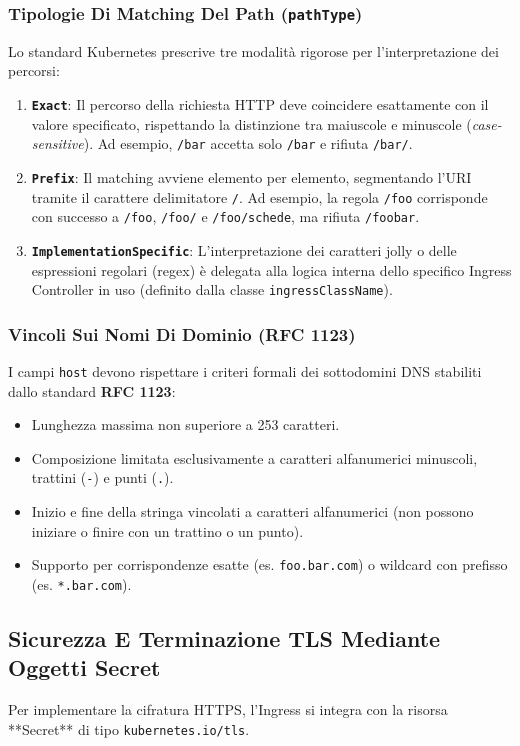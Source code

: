 \documentclass[11pt, a4paper]{article}
\begin{document}
\subsubsection{Tipologie Di Matching Del Path (\texttt{pathType})}
Lo standard Kubernetes prescrive tre modalità rigorose per l'interpretazione dei percorsi:
\begin{enumerate}[noitemsep]
    \item \textbf{\texttt{Exact}}: Il percorso della richiesta HTTP deve coincidere esattamente con il valore specificato, rispettando la distinzione tra maiuscole e minuscole (\emph{case-sensitive}). Ad esempio, \texttt{/bar} accetta solo \texttt{/bar} e rifiuta \texttt{/bar/}.
    \item \textbf{\texttt{Prefix}}: Il matching avviene elemento per elemento, segmentando l'URI tramite il carattere delimitatore \texttt{/}. Ad esempio, la regola \texttt{/foo} corrisponde con successo a \texttt{/foo}, \texttt{/foo/} e \texttt{/foo/schede}, ma rifiuta \texttt{/foobar}.
    \item \textbf{\texttt{ImplementationSpecific}}: L'interpretazione dei caratteri jolly o delle espressioni regolari (regex) è delegata alla logica interna dello specifico Ingress Controller in uso (definito dalla classe \texttt{ingressClassName}).
\end{enumerate}

\subsubsection{Vincoli Sui Nomi Di Dominio (RFC 1123)}
I campi \texttt{host} devono rispettare i criteri formali dei sottodomini DNS stabiliti dallo standard \textbf{RFC 1123}:
\begin{itemize}[noitemsep]
    \item Lunghezza massima non superiore a 253 caratteri.
    \item Composizione limitata esclusivamente a caratteri alfanumerici minuscoli, trattini (\texttt{-}) e punti (\texttt{.}).
    \item Inizio e fine della stringa vincolati a caratteri alfanumerici (non possono iniziare o finire con un trattino o un punto).
    \item Supporto per corrispondenze esatte (es. \texttt{foo.bar.com}) o wildcard con prefisso (es. \texttt{*.bar.com}).
\end{itemize}

\subsection{Sicurezza E Terminazione TLS Mediante Oggetti Secret}
Per implementare la cifratura HTTPS, l'Ingress si integra con la risorsa **Secret** di tipo \texttt{kubernetes.io/tls}.
\end{document}

